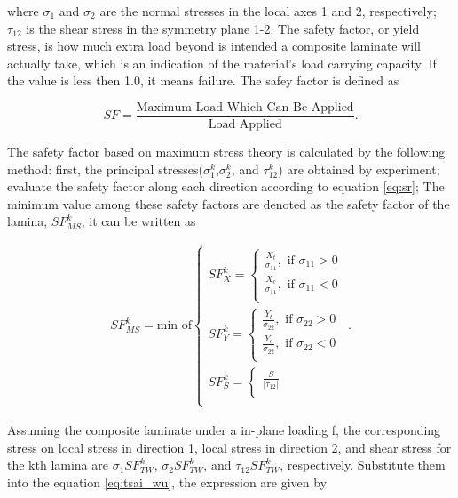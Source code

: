 where $\sigma_1$ and $\sigma_2$ are the normal stresses in the local axes 1 and 2, respectively;
$\tau_{12}$ is the shear stress in the symmetry plane 1-2.
The safety factor, or yield stress, is how much extra load beyond is intended a
composite laminate will actually take, which is an indication of the material's
load carrying capacity. If the value is less then 1.0, it means failure. The safey factor is defined as 

\begin{equation} \label{eq:sr}SF=\frac{\text {Maximum Load Which Can Be
	Applied}}{\text {Load Applied}} {\textstyle .}
\end{equation}

The safety factor based on maximum stress theory is calculated by the following
method: first, the principal stresses($\sigma_1^k$,$\sigma_2^k$, and
$\tau_{12}^k$) are obtained by experiment; evaluate the safety factor along each
direction according to equation \ref{eq:sr}; The minimum value among these
safety factors are denoted as the safety factor of the lamina, $SF_{MS}^k$, it
can be written as 

\begin{align}
	SF_{MS}^k = \text{min of}
	\begin{cases}
		SF_X^k = 
		\begin{cases}
			\frac{X_t}{\sigma_{11}}, \text{ if } \sigma_{11}>0 \\
			\frac{X_c}{\sigma_{11}}, \text{ if } \sigma_{11}<0 \\
		\end{cases} \\
		SF_Y^k = 
		\begin{cases}
			\frac{Y_t}{\sigma_{22}}, \text{ if } \sigma_{22}>0 \\
			\frac{Y_c}{\sigma_{22}}, \text{ if } \sigma_{22}<0 \\
		\end{cases} \\
		SF_S^k =
		\begin{cases}
			\frac{S}{|\tau_{12}|} \\
		\end{cases} \\
	\end{cases} \textstyle{.}
\end{align}


Assuming the composite laminate under a in-plane loading f, the corresponding
stress on local stress in direction 1, local stress in direction 2, and shear
stress for the kth lamina are $\sigma_1 SF_{TW}^k$, $\sigma_2SF_{TW}^k$, and $\tau_{12}SF_{TW}^k$,
respectively. Substitute them into the equation \ref{eq:tsai_wu}, the expression
are given by

